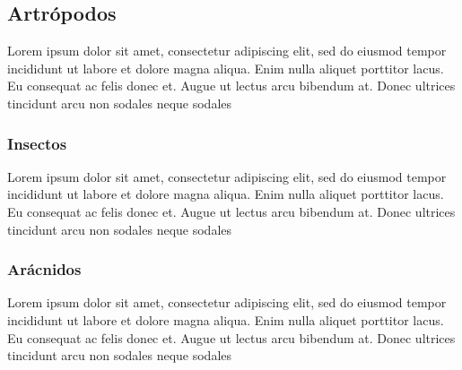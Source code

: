 \documentclass[a4]{book}
\begin{document}
	\subsection{Artrópodos}
	Lorem ipsum dolor sit amet, consectetur adipiscing elit, sed do eiusmod tempor incididunt ut labore et dolore magna aliqua. Enim nulla aliquet porttitor lacus. Eu consequat ac felis donec et. Augue ut lectus arcu bibendum at. Donec ultrices tincidunt arcu non sodales neque sodales
	
		\subsubsection{Insectos}
		Lorem ipsum dolor sit amet, consectetur adipiscing elit, sed do eiusmod tempor incididunt ut labore et dolore magna aliqua. Enim nulla aliquet porttitor lacus. Eu consequat ac felis donec et. Augue ut lectus arcu bibendum at. Donec ultrices tincidunt arcu non sodales neque sodales
		
		\subsubsection{Arácnidos}
		Lorem ipsum dolor sit amet, consectetur adipiscing elit, sed do eiusmod tempor incididunt ut labore et dolore magna aliqua. Enim nulla aliquet porttitor lacus. Eu consequat ac felis donec et. Augue ut lectus arcu bibendum at. Donec ultrices tincidunt arcu non sodales neque sodales
		
	
\end{document}
